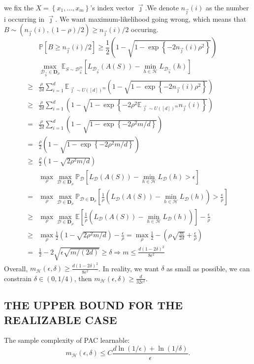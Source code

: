 we fix the $ X = \left\{ x_1, \ldots, x_m \right\} $'s index vector $ \vec{\jmath} $.We denote $ n_{\vec{\jmath}}(i) $ as the number i occurring in $ \vec{\jmath} $. We want maximum-likelihood going wrong, which means that $ B \sim (n_{\vec{\jmath}}(i), (1-\rho)/2) \ge n_{\vec{\jmath}}(i)/2 $ occuring.
\[
    \mathbb{P}\left[ B \ge n_{\vec{\jmath}}(i) /2 \right] \ge \frac{1}{2} \left( 1 - \sqrt{1 - \exp \left\{ -2 n _{\vec{\jmath}}(i)\rho^2\right\}} \right)
\]
\begin{align*}
    &\max_{\mathcal{D}_{\vec{b}} \in \mathbf{D}_\rho} \mathbb{E}_{S \sim \mathcal{D}^m_{\vec{b}}} \left[ L_{\mathcal{D}_{\vec{b}}}(A(S)) - \min_{h \in \mathcal{H}} L_{\mathcal{D}_{\vec{b}}}(h) \right]\\
    \ge& \frac{\rho}{2d} \sum^{d}_{i=1} \mathbb{E}_{\vec{\jmath} \sim {U ([d])}^m} \left( 1 - \sqrt{1 - \exp \left\{ -2 n _{\vec{\jmath}}(i)\rho^2\right\}} \right)\\
    \ge& \frac{\rho}{2d} \sum^{d}_{i=1} \left( 1 - \sqrt{1 - \exp \left\{ -2 \rho^2\mathbb{E}_{\vec{\jmath} \sim {U ([d])}^m} n _{\vec{\jmath}}(i)\right\}} \right)\\
    =& \frac{\rho}{2d} \sum^{d}_{i=1} \left( 1 - \sqrt{1 - \exp \left\{ -2 \rho^2 m/d \right\}} \right)\\
    =& \frac{\rho}{2} \left( 1 - \sqrt{1 - \exp \left\{ -2 \rho^2 m/d \right\}} \right)\\
    \ge& \frac{\rho}{2} \left( 1 - \sqrt{2\rho^2m/d} \right)\\
    & \max_{\rho}\max_{\mathcal{D} \in \mathbf{D}_\rho}\mathbb{P}_{\mathcal{D}} \left[ L_{\mathcal{D}}(A(S)) - \min_{h\in \mathcal{H}} L_{\mathcal{D}}(h) > \epsilon \right]\\
    =& \max_{\rho}\max_{\mathcal{D} \in \mathbf{D}_\rho} \mathbb{P}_{\mathcal{D} \in \mathbf{D}_\rho} \left[ \frac{1}{\rho} \left(  L_{\mathcal{D}}(A(S)) - \min_{h\in \mathcal{H}} L_{\mathcal{D}}(h) \right)> \frac{\epsilon}{\rho} \right]\\
    \ge& \max_{\rho}\max_{\mathcal{D} \in \mathbf{D}_\rho} \mathbb{E}\left[ \frac{1}{\rho} \left(  L_{\mathcal{D}}(A(S)) - \min_{h\in \mathcal{H}} L_{\mathcal{D}}(h) \right) \right] - \frac{\epsilon}{\rho} \\
    \ge& \max_{\rho}\frac{1}{2} \left( 1 - \sqrt{2\rho^2m/d} \right) - \frac{\epsilon}{\rho}
    = \max_{\rho}\frac{1}{2} - \left( \rho \sqrt{\frac{m}{2d}} + \frac{\epsilon}{\rho} \right)\\
    =& \frac{1}{2} - 2 \sqrt{\epsilon \sqrt{m/(2d)}} \ge \delta \Rightarrow m \le \frac{d{(1 - 2\delta)}^2}{8 \epsilon^2} 
\end{align*}
Overall, $ m_{\mathcal{H}}(\epsilon, \delta) \ge \frac{d{(1-2\delta)}^2}{8\epsilon^2}$. In reality, we want $ \delta $ as small as possible, we can constrain $ \delta \in (0, 1/4) $, then $ m_{\mathcal{H}}(\epsilon, \delta) \ge \frac{d}{32 \epsilon^2} $.

\subsection{THE UPPER BOUND FOR THE REALIZABLE CASE}%
\label{sub:the_upper_bound_for_the_realizable_case}

The sample complexity of PAC learnable:
\[
    m_{\mathcal{H}}(\epsilon, \delta) \le C \frac{d\ln(1/\epsilon) + \ln(1/\delta)}{\epsilon}.
\]




